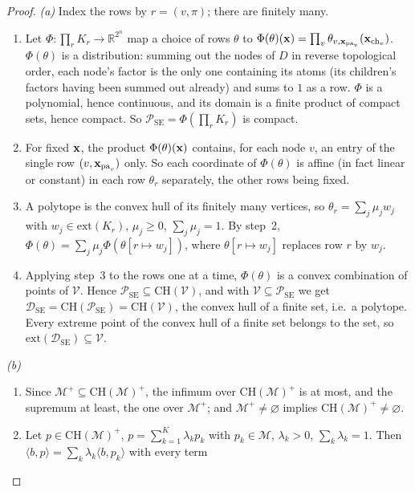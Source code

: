 \documentclass{article} %
\newcommand{\DSE}{\mathcal{D}_{\mathrm{SE}}}
\newcommand{\ch}{\mathrm{ch}}
\newcommand{\pa}{\mathrm{pa}}
\newcommand{\ext}{\mathrm{ext}}
\begin{document}
\begin{proof}
\emph{(a)} Index the rows by $r=(v,\pi)$; there are finitely many.
\begin{enumerate}
  \item Let $\Phi:\prod_rK_r\to\mathbb R^{2^n}$ map a choice of rows $\theta$ to
  $\Phi(\theta)(\bx)=\prod_v\theta_{v,\bx_{\pa_v}}(\bx_{\ch_v})$. $\Phi(\theta)$
  is a distribution: summing out the nodes of $D$ in reverse topological order,
  each node's factor is the only one containing its atoms (its children's
  factors having been summed out already) and sums to $1$ as a row. $\Phi$ is a
  polynomial, hence continuous, and its domain is a finite product of compact
  sets, hence compact. So $\mathcal P_{\mathrm{SE}}=\Phi(\prod_rK_r)$ is compact.
  \item For fixed $\mathbf{x}$, the product $\Phi(\theta)(\mathbf{x})$ contains, for each node
  $v$, an entry of the single row $(v,\bx_{\pa_v})$ only. So each coordinate of
  $\Phi(\theta)$ is affine (in fact linear or constant) in each row $\theta_r$
  separately, the other rows being fixed.
  \item A polytope is the convex hull of its finitely many vertices, so
  $\theta_r=\sum_j\mu_jw_j$ with $w_j\in\ext(K_r)$, $\mu_j\ge0$, $\sum_j\mu_j=1$.
  By step~2, $\Phi(\theta)=\sum_j\mu_j\Phi(\theta[r\mapsto w_j])$, where
  $\theta[r\mapsto w_j]$ replaces row $r$ by $w_j$.
  \item Applying step~3 to the rows one at a time, $\Phi(\theta)$ is a convex
  combination of points of $\mathcal V$. Hence
  $\mathcal P_{\mathrm{SE}}\subseteq\mathrm{CH}(\mathcal V)$, and with
  $\mathcal V\subseteq\mathcal P_{\mathrm{SE}}$ we get
  $\DSE=\mathrm{CH}(\mathcal P_{\mathrm{SE}})=\mathrm{CH}(\mathcal V)$, the
  convex hull of a finite set, i.e.\ a polytope. Every extreme point of the
  convex hull of a finite set belongs to the set, so $\ext(\DSE)\subseteq\mathcal V$.
\end{enumerate}
\emph{(b)}
\begin{enumerate}
  \item Since $\mathcal M^+\subseteq\mathrm{CH}(\mathcal M)^+$, the infimum over
  $\mathrm{CH}(\mathcal M)^+$ is at most, and the supremum at least, the one
  over $\mathcal M^+$; and $\mathcal M^+\neq\varnothing$ implies
  $\mathrm{CH}(\mathcal M)^+\neq\varnothing$.
  \item Let $p\in\mathrm{CH}(\mathcal M)^+$, $p=\sum_{k=1}^K\lambda_kp_k$ with
  $p_k\in\mathcal M$, $\lambda_k>0$, $\sum_k\lambda_k=1$. Then
  $\langle b,p\rangle=\sum_k\lambda_k\langle b,p_k\rangle$ with every term

\end{enumerate}
\end{proof}
\end{document}
